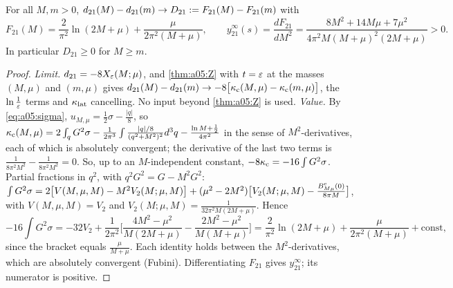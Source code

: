 \begin{lemma}\label{lem:a05:21}
For all $M,m>0$, $d_{21}(M)-d_{21}(m)\to D_{21}:= F_{21}(M)-F_{21}(m)$ with
\[
F_{21}(M)=\frac2{\pi^2}\ln(2M+\mu)+\frac{\mu}{2\pi^2(M+\mu)},\qquad
y^\infty_{21}(s)=\frac{dF_{21}}{dM^2}=\frac{8M^2+14M\mu+7\mu^2}{4\pi^2M(M+\mu)^2(2M+\mu)}>0 .
\]
In particular $D_{21}\ge0$ for $M\ge m$.
\end{lemma}
\begin{proof}
\emph{Limit.} $d_{21}=-8X_{\varepsilon}(M;\mu)$, and \cref{thm:a05:Z} with $t=\varepsilon$ at the masses $(M,\mu)$ and $(m,\mu)$ gives $d_{21}(M)-d_{21}(m)\to-8\big[\kappa_{\rm c}(M,\mu)-\kappa_{\rm c}(m,\mu)\big]$, the $\ln\frac1{\varepsilon}$ terms and $\kappa_{\rm lat}$ cancelling. No input beyond \cref{thm:a05:Z} is used.
\emph{Value.} By \eqref{eq:a05:sigma}, $u_{M,\mu}=\frac12\sigma-\frac{|q|}8$, so $\kappa_{\rm c}(M,\mu)=2\int_qG^2\sigma-\frac1{2\pi^3}\int\frac{|q|/8}{(q^2+M^2)^2}d^3q-\frac{\ln M+\frac12}{4\pi^2}$ in the sense of $M^2$-derivatives, each of which is absolutely convergent; the derivative of the last two terms is $\frac1{8\pi^2M^2}-\frac1{8\pi^2M^2}=0$. So, up to an $M$-independent constant, $-8\kappa_{\rm c}=-16\int G^2\sigma$. Partial fractions in $q^2$, with $q^2G^2=G-M^2G^2$:
$\int G^2\sigma=2\big[V(M,\mu,M)-M^2V_2(M;\mu,M)\big]+(\mu^2-2M^2)\big[V_2(M;\mu,M)-\frac{B^{\mathrm c}_{M\mu}(0)}{8\pi M}\big]$, with $V(M,\mu,M)=V_2$ and $V_2(M;\mu,M)=\frac1{32\pi^2M(2M+\mu)}$. Hence
\[
-16\int G^2\sigma=-32V_2+\frac1{2\pi^2}\Big[\frac{4M^2-\mu^2}{M(2M+\mu)}-\frac{2M^2-\mu^2}{M(M+\mu)}\Big]=\frac2{\pi^2}\ln(2M+\mu)+\frac{\mu}{2\pi^2(M+\mu)}+\text{const},
\]
since the bracket equals $\frac{\mu}{M+\mu}$. Each identity holds between the $M^2$-derivatives, which are absolutely convergent (Fubini). Differentiating $F_{21}$ gives $y^\infty_{21}$; its numerator is positive.
\end{proof}

